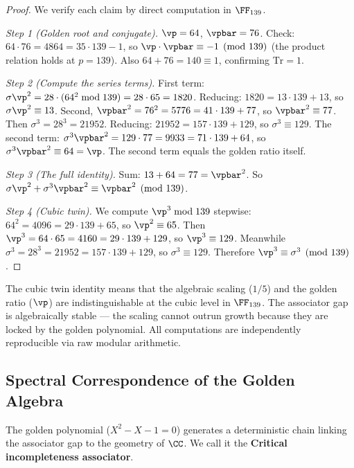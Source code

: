\begin{proof}
We verify each claim by direct computation in $\FF_{139}$.

\emph{Step 1 (Golden root and conjugate).} $\vp = 64$, $\vpbar = 76$. Check: $64 \cdot 76 = 4864 = 35 \cdot 139 - 1$, so $\vp \cdot \vpbar \equiv -1 \pmod{139}$ (the product relation holds at $p = 139$). Also $64 + 76 = 140 \equiv 1$, confirming $\mathrm{Tr} = 1$.

\emph{Step 2 (Compute the series terms).} First term: $\sigma \vp^2 = 28 \cdot (64^2 \bmod 139) = 28 \cdot 65 = 1820$. Reducing: $1820 = 13 \cdot 139 + 13$, so $\sigma \vp^2 \equiv 13$. Second, $\vpbar^2 = 76^2 = 5776 = 41 \cdot 139 + 77$, so $\vpbar^2 \equiv 77$. Then $\sigma^3 = 28^3 = 21952$. Reducing: $21952 = 157 \cdot 139 + 129$, so $\sigma^3 \equiv 129$. The second term: $\sigma^3 \vpbar^2 = 129 \cdot 77 = 9933 = 71 \cdot 139 + 64$, so $\sigma^3 \vpbar^2 \equiv 64 = \vp$. The second term equals the golden ratio itself.

\emph{Step 3 (The full identity).} Sum: $13 + 64 = 77 = \vpbar^2$. So $\sigma\vp^2 + \sigma^3\vpbar^2 \equiv \vpbar^2 \pmod{139}$.

\emph{Step 4 (Cubic twin).} We compute $\vp^3 \bmod 139$ stepwise: $64^2 = 4096 = 29 \cdot 139 + 65$, so $\vp^2 \equiv 65$. Then $\vp^3 = 64 \cdot 65 = 4160 = 29 \cdot 139 + 129$, so $\vp^3 \equiv 129$. Meanwhile $\sigma^3 = 28^3 = 21952 = 157 \cdot 139 + 129$, so $\sigma^3 \equiv 129$. Therefore $\vp^3 \equiv \sigma^3 \pmod{139}$. \qedhere
\end{proof}

\begin{remark}
The cubic twin identity means that the algebraic scaling ($1/5$) and the golden ratio ($\vp$) are indistinguishable at the cubic level in $\FF_{139}$. The associator gap is algebraically stable --- the scaling cannot outrun growth because they are locked by the golden polynomial. All computations are independently reproducible via raw modular arithmetic.
\end{remark}


\subsection{Spectral Correspondence of the Golden Algebra}

The golden polynomial ($X^2 - X - 1 = 0$) generates a deterministic chain linking the associator gap to the geometry of $\CC$. We call it the \textbf{Critical incompleteness associator}.

